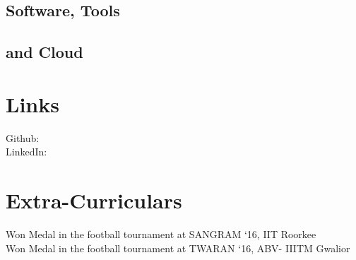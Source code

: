 \documentclass[]{resume}
\begin{document}
\begin{minipage}[t]{0.33\textwidth}
\sectionsep

\subsection{Software, Tools}
\subsection{and Cloud}
\sectionsep

\section{Links} 
Github:  \href{https://github.com/codery2k}{} \\
LinkedIn:  \href{https://www.linkedin.com/in/saurabh-miglani/}{} \\
\sectionsep

\section{Extra-Curriculars} 
Won  Medal in the football tournament at SANGRAM ‘16, IIT Roorkee \\
Won  Medal in the football tournament at TWARAN ‘16, ABV- IIITM Gwalior

\sectionsep

%
%

\end{minipage} 
\hfill
\end{document}
